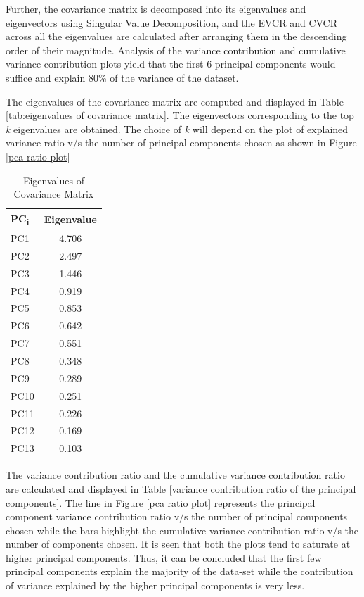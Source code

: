 Further, the covariance matrix is decomposed into its eigenvalues and eigenvectors using Singular Value Decomposition, and the EVCR and CVCR across all the eigenvalues are calculated after arranging them in the descending order of their magnitude. Analysis of the variance contribution and cumulative variance contribution plots yield that the first 6 principal components would suffice and explain 80\% of the variance of the dataset.

The eigenvalues of the covariance matrix are computed and displayed in Table \ref{tab:eigenvalues of covariance matrix}. The eigenvectors corresponding to the top \textit{k} eigenvalues are obtained. The choice of \textit{k} will depend on the plot of explained variance ratio v/s the number of principal components chosen as shown in Figure \ref{pca ratio plot}

\begin{table}[h]
	\centering
	\fontsize{10}{12}\selectfont
	\caption{Eigenvalues of Covariance Matrix}
	\label{tab:eigenvalues of covariance matrix}
	\begin{tabular}{|p{3cm}|c|}
		\hline
		\textbf{PC\textsubscript{i}} & \textbf{Eigenvalue} \\
		\hline
		PC1 & 4.706\\
		\hline
		PC2 & 2.497\\
		\hline
		PC3 & 1.446\\
		\hline
		PC4 & 0.919\\
		\hline
		PC5 & 0.853\\
		\hline
		PC6 & 0.642\\
		\hline
		PC7 & 0.551\\
		\hline
		PC8 & 0.348\\
		\hline
		PC9 & 0.289\\
		\hline
		PC10 & 0.251\\
		\hline
		PC11 & 0.226\\
		\hline
		PC12 & 0.169\\
		\hline
		PC13 & 0.103\\
		\hline
	\end{tabular}
	
	\label{table:3}
\end{table}

The variance contribution ratio and the cumulative variance contribution ratio are calculated and displayed in Table \ref{variance contribution ratio of the principal components}. The line in Figure \ref{pca ratio plot} represents the principal component variance contribution ratio v/s the number of principal components chosen while the bars highlight the cumulative variance contribution ratio v/s the number of components chosen. It is seen that both the plots tend to saturate at higher principal components. Thus, it can be concluded that the first few principal components explain the majority of the data-set while the contribution of variance explained by the higher principal components is very less.

